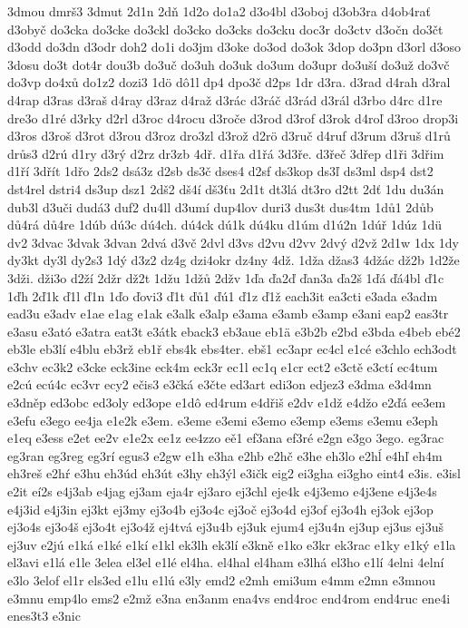 {3dmou
dmrš3
3dmut
2d1n
2dň
1d2o
do1a2
d3o4bl
d3oboj
d3ob3ra
d4ob4rať
d3obyč
do3cka
do3cke
do3ckl
do3cko
do3cks
do3cku
doc3r
do3ctv
d3očn
do3čt
d3odd
do3dn
d3odr
doh2
do1i
do3jm
d3oke
do3od
do3ok
3dop
do3pn
d3orl
d3oso
3dosu
do3t
dot4r
dou3b
do3uč
do3uh
do3uk
do3um
do3upr
do3uší
do3už
do3vč
do3vp
do4xů
do1z2
dozi3
1dö
dô1l
dp4
dpo3č
d2ps
1dr
d3ra.
d3rad
d4rah
d3ral
d4rap
d3ras
d3raš
d4ray
d3raz
d4raž
d3rác
d3ráč
d3rád
d3rál
d3rbo
d4rc
d1re
dre3o
d1ré
d3rky
d2rl
d3roc
d4rocu
d3roče
d3rod
d3rof
d3rok
d4roľ
d3roo
drop3i
d3ros
d3roš
d3rot
d3rou
d3roz
dro3zl
d3rož
d2rö
d3ruč
d4ruf
d3rum
d3ruš
d1rů
drůs3
d2rú
d1ry
d3rý
d2rz
dr3zb
4dř.
d1řa
d1řá
3d3ře.
d3řeč
3dřep
d1ři
3dřim
d1ří
3dřít
1dřo
2ds2
dsá3z
d2sb
ds3č
dses4
d2sf
ds3kop
ds3ľ
ds3ml
dsp4
dst2
dst4rel
dstri4
ds3up
dsz1
2dš2
dš4í
dš3ťu
2d1t
dt3lá
dt3ro
d2tt
2dť
1du
du3án
dub3l
d3uči
dudá3
duf2
du4ll
d3umí
dup4lov
duri3
dus3t
dus4tm
1dů1
2důb
dů4rá
dů4re
1dúb
dú3c
dú4ch.
dú4ck
dú1k
dú4ku
d1úm
d1ú2n
1dúř
1dúz
1dü
dv2
3dvac
3dvak
3dvan
2dvá
d3vč
2dvl
d3vs
d2vu
d2vv
2dvý
d2vž
2d1w
1dx
1dy
dy3kt
dy3l
dy2s3
1dý
d3z2
dz4g
dzi4okr
dz4ny
4dž.
1dža
džas3
4džác
dž2b
1d2že
3dži.
dži3o
d2ží
2džr
dž2t
1džu
1džů
2džv
1ďa
ďa2ď
ďan3a
ďa2š
1ďá
ďá4bl
ď1c
1ďh
2ď1k
ď1l
ď1n
1ďo
ďovi3
ď1t
ďů1
ďú1
ď1z
ď1ž
each3it
ea3cti
e3ada
e3adm
ead3u
e3adv
e1ae
e1ag
e1ak
e3alk
e3alp
e3ama
e3amb
e3amp
e3ani
eap2
eas3tr
e3asu
e3ató
e3atra
eat3t
e3átk
eback3
eb3aue
eb1ä
e3b2b
e2bd
e3bda
e4beb
ebé2
eb3le
eb3lí
e4blu
eb3rž
eb1ř
ebs4k
ebs4ter.
ebš1
ec3apr
ec4cl
e1cé
e3chlo
ech3odt
e3chv
ec3k2
e3cke
eck3ine
eck4m
eck3r
ec1l
ec1q
e1cr
ect2
e3ctě
e3ctí
ec4tum
e2cú
ecú4c
ec3vr
ecy2
ečis3
e3čká
e3čte
ed3art
edi3on
edjez3
e3dma
e3d4mn
e3dněp
ed3obc
ed3oly
ed3ope
e1dô
ed4rum
e4dřiš
e2dv
e1dž
e4džo
e2ďá
ee3em
e3efu
e3ego
ee4ja
e1e2k
e3em.
e3eme
e3emi
e3emo
e3emp
e3ems
e3emu
e3eph
e1eq
e3ess
e2et
ee2v
e1e2x
ee1z
ee4zzo
eě1
ef3ana
ef3ré
e2gn
e3go
3ego.
eg3rac
eg3ran
eg3reg
eg3rí
egus3
e2gw
e1h
e3ha
e2hb
e2hč
e3he
eh3lo
e2hĺ
e4hľ
eh4m
eh3reš
e2hŕ
e3hu
eh3úd
eh3út
e3hy
eh3ýl
e3ičk
eig2
ei3gha
ei3gho
eint4
e3is.
e3isl
e2it
eí2s
e4j3ab
e4jag
ej3am
eja4r
ej3aro
ej3chl
eje4k
e4j3emo
e4j3ene
e4j3e4s
e4j3id
e4j3in
ej3kt
ej3my
ej3o4b
ej3o4c
ej3oč
ej3o4d
ej3of
ej3o4h
ej3ok
ej3op
ej3o4s
ej3o4š
ej3o4t
ej3o4ž
ej4tvá
ej3u4b
ej3uk
ejum4
ej3u4n
ej3up
ej3us
ej3uš
ej3uv
e2jú
e1ká
e1ké
e1kí
e1kl
ek3lh
ek3lí
e3kně
e1ko
e3kr
ek3rac
e1ky
e1ký
e1la
el3avi
e1lá
e1le
3elea
el3el
e1lé
el4ha.
el4hal
el4ham
e3lhá
el3ho
e1lí
4elni
4elní
e3lo
3elof
el1r
els3ed
e1lu
e1lú
e3ly
emd2
e2mh
emi3um
e4mm
e2mn
e3mnou
e3mnu
emp4lo
ems2
e2mž
e3na
en3anm
ena4vs
end4roc
end4rom
end4ruc
ene4i
enes3t3
e3nic
}
